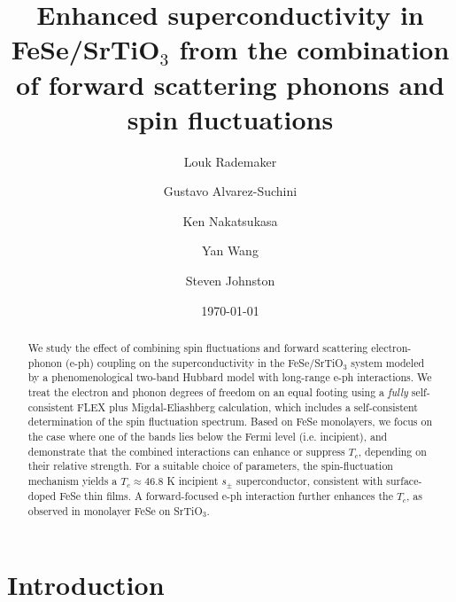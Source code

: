 \documentclass[%
 reprint,
 superscriptaddress,
nofootinbib,
nobibnotes,
 amsmath,amssymb,
 aps,
 prb,
 dvipsnames, 
 floatfix
]{revtex4-2}
\newcommand{\eph}{e-ph}
\begin{document}
\title{Enhanced superconductivity in FeSe/SrTiO$_3$ from the combination of forward scattering phonons and spin fluctuations}

\author{Louk Rademaker}

\author{Gustavo Alvarez-Suchini} 

\author{Ken Nakatsukasa}

\author{Yan Wang}

\author{Steven Johnston}

\date{\today}

\begin{abstract}
We study the effect of combining spin fluctuations and forward scattering electron-phonon ({\eph}) coupling on the superconductivity in the FeSe/SrTiO$_3$ system modeled by a phenomenological two-band Hubbard model with long-range {\eph} interactions. We treat the electron and phonon degrees of freedom on an equal footing using a \emph{fully} self-consistent FLEX plus Migdal-Eliashberg calculation, which includes a self-consistent determination of the spin fluctuation spectrum. Based on FeSe monolayers, we focus on the case where one of the bands lies below the Fermi level (i.e. incipient), and demonstrate that the combined interactions can enhance or suppress $T_c$, depending on their relative strength. For a suitable choice of parameters, the spin-fluctuation mechanism yields a $T_c \approx 46.8$ K incipient $s_\pm$ superconductor, consistent with surface-doped FeSe thin films. A forward-focused {\eph} interaction further enhances the $T_c$, as observed in monolayer FeSe on SrTiO$_3$.
\end{abstract}

\maketitle

\section{Introduction}
\end{document}
